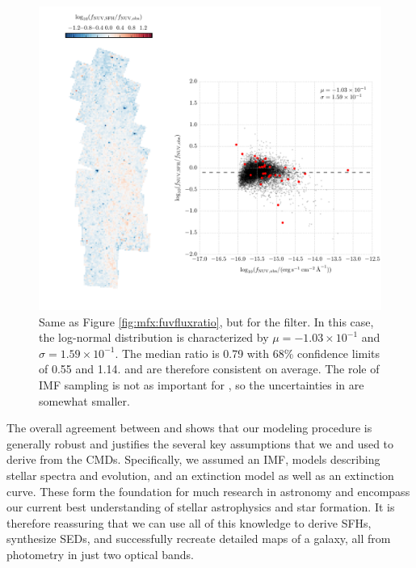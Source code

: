 \documentclass[iop, tighten]{emulateapj}
\begin{document}
\begin{figure}
\centering
\includegraphics[width=\textwidth]{m31flux-figures/flux_nuv_sfh-vs-obs.pdf}
\caption[Ratio of the synthetic flux to the observed flux in the \nuv{}
filter.]{Same as Figure \ref{fig:mfx:fuvfluxratio}, but for the \nuv{} filter.
    In this case, the log-normal distribution is characterized by $\mu =
    -1.03\times 10^{-1}$ and $\sigma = 1.59\times 10^{-1}$. The median ratio is
    0.79 with 68\% confidence limits of 0.55 and 1.14. \fnuvsfh{} and
    \fnuvobs{} are therefore consistent on average. The role of IMF sampling is
    not as important for \fnuvobs{}, so the uncertainties in \fnuvsfh{} are
    somewhat smaller.
}
\label{fig:mfx:nuvfluxratio}
\end{figure}


The overall agreement between \fxsfh{} and \fxobs{} shows that our modeling
procedure is generally robust and justifies the several key assumptions that we
and \citet{Lewis:2014} used to derive \fxsfh{} from the CMDs. Specifically, we
assumed an IMF, models describing stellar spectra and evolution, and an
extinction model as well as an extinction curve. These form the foundation for
much research in astronomy and encompass our current best understanding of
stellar astrophysics and star formation. It is therefore reassuring that we can
use all of this knowledge to derive SFHs, synthesize SEDs, and successfully
recreate detailed maps of a galaxy, all from photometry in just two optical
bands.
\end{document}

